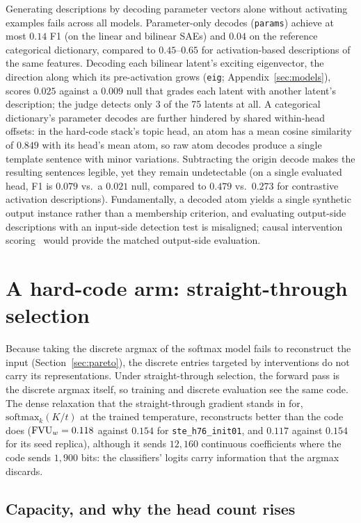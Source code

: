 Generating descriptions by decoding parameter vectors alone without
activating examples fails across all models. Parameter-only decodes
(\texttt{params}) achieve at most $0.14$ F1 (on the linear and bilinear
SAEs) and $0.04$ on the reference categorical dictionary, compared to
$0.45$--$0.65$ for activation-based descriptions of the same features.
Decoding each bilinear latent's exciting eigenvector, the direction along
which its pre-activation grows (\texttt{eig};
Appendix~\ref{sec:models}), scores $0.025$ against a $0.009$ null that
grades each latent with another latent's description; the judge detects
only 3 of the 75 latents at all.
A categorical dictionary's parameter decodes are further hindered by
shared within-head offsets: in the hard-code stack's topic head, an atom
has a mean cosine similarity of $0.849$ with its head's mean atom, so raw atom decodes produce a single template
sentence with minor variations. Subtracting the origin decode makes the
resulting sentences legible, yet they remain undetectable (on a single
evaluated head, F1 is $0.079$ vs.\ a $0.021$ null, compared to $0.479$ vs.\
$0.273$ for contrastive activation descriptions). Fundamentally, a decoded
atom yields a single synthetic output instance rather than a membership
criterion, and evaluating output-side descriptions with an input-side
detection test is misaligned; causal intervention scoring~\cite{paulo2025}
would provide the matched output-side evaluation.

\section{A hard-code arm: straight-through selection}
\label{sec:ste}

Because taking the discrete argmax of the softmax model fails to reconstruct
the input (Section~\ref{sec:pareto}), the discrete entries targeted by
interventions do not carry its representations. Under straight-through
selection, the forward pass is the discrete argmax itself, so training and
discrete evaluation see the same code. The dense relaxation that the
straight-through gradient stands in for, $\mathrm{softmax}_k(K/t)$ at the trained
temperature, reconstructs better than the code does ($\mathrm{FVU}_w = 0.118$ against
$0.154$ for \texttt{ste\_h76\_init01}, and $0.117$ against $0.154$ for its
seed replica), although it sends $12{,}160$ continuous coefficients where
the code sends $1{,}900$ bits: the classifiers' logits carry information
that the argmax discards.

\subsection{Capacity, and why the head count rises}

